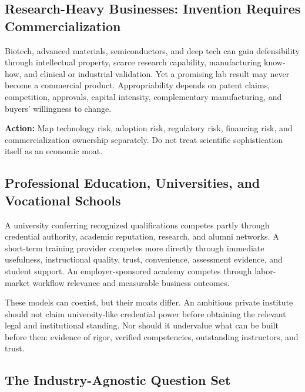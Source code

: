 \subsection{Research-Heavy Businesses: Invention Requires Commercialization}
\label{sec:research_heavy_businesses_commercialization}

Biotech, advanced materials, semiconductors, and deep tech can gain defensibility through intellectual property, scarce research capability, manufacturing know-how, and clinical or industrial validation. Yet a promising lab result may never become a commercial product. Appropriability depends on patent claims, competition, approvals, capital intensity, complementary manufacturing, and buyers' willingness to change.

\vspace{0.5em}
\noindent\textbf{Action:} Map technology risk, adoption risk, regulatory risk, financing risk, and commercialization ownership separately. Do not treat scientific sophistication itself as an economic moat.

\subsection{Professional Education, Universities, and Vocational Schools}
\label{sec:education_universities_vocational_different}

A university conferring recognized qualifications competes partly through credential authority, academic reputation, research, and alumni networks. A short-term training provider competes more directly through immediate usefulness, instructional quality, trust, convenience, assessment evidence, and student support. An employer-sponsored academy competes through labor-market workflow relevance and measurable business outcomes.

These models can coexist, but their moats differ. An ambitious private institute should not claim university-like credential power before obtaining the relevant legal and institutional standing. Nor should it undervalue what can be built before then: evidence of rigor, verified competencies, outstanding instructors, and trust.

\subsection{The Industry-Agnostic Question Set}
\label{sec:industry_agnostic_question_set}

